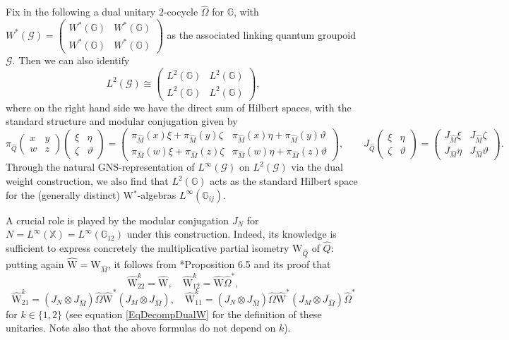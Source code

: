 \documentclass[reqno]{amsart}
\numberwithin{equation}{section}
\newcommand{\G}{\mathbb{G}}
\newcommand{\X}{\mathbb{X}}
\newcommand{\msG}{\mathscr{G}}
\newcommand{\ww}{\mathrm{W}}
\begin{document}
Fix in the following a dual unitary $2$-cocycle $\hat{\Omega}$ for $\G$, with $W^*(\msG) = \begin{pmatrix} W^*(\G) & W^*(\G)\\ W^*(\G)& W^*(\G)\end{pmatrix}$ as the associated linking quantum groupoid $\msG$. Then we can also identify
\[
L^2(\msG)\cong \begin{pmatrix} L^2(\G)& L^2(\G)\\L^2(\G)&L^2(\G)\end{pmatrix}, 
\] 
where on the right hand side we have the direct sum of Hilbert spaces, with the standard structure and modular conjugation given by 
\[
\pi_{\hat{Q}}\begin{pmatrix} x & y \\ w & z\end{pmatrix}
\begin{pmatrix}
\xi & \eta \\ \zeta & \vartheta
\end{pmatrix}
 = \begin{pmatrix} \pi_{\hat{M}}(x)\xi + \pi_{\hat{M}}(y) \zeta & \pi_{\hat{M}}(x)\eta +\pi_{\hat{M}}(y)\vartheta\\ \pi_{\hat{M}}(w)\xi+\pi_{\hat{M}}(z)\zeta & \pi_{\hat{M}}(w)\eta +\pi_{\hat{M}}(z)\vartheta\end{pmatrix},\qquad J_{\hat{Q}}\begin{pmatrix} \xi & \eta\\ \zeta & \vartheta\end{pmatrix} = \begin{pmatrix} J_{\hat{M}}\xi & J_{\hat{M}}\zeta\\ J_{\hat{M}}\eta & J_{\hat{M}}\vartheta\end{pmatrix}. 
\]
Through the natural GNS-representation of $L^{\infty}(\msG)$ on $L^2(\msG)$ via the dual weight construction, we also find that $L^2(\G)$ acts as the standard Hilbert space for the (generally distinct) W$^*$-algebras $L^{\infty}(\G_{ij})$. 

A crucial role is played by the modular conjugation $J_N$ for $N = L^{\infty}(\X) = L^{\infty}(\G_{12})$ under this construction. Indeed, its knowledge is sufficient to express concretely the multiplicative partial isometry $\ww_{\hat{Q}}$ of $\hat{Q}$: putting again $\hat{\ww}= \ww_{\hat{M}}$, it follows from \cite{DC11b}*{Proposition 6.5} and its proof that
\begin{equation}\label{EqMultUnitCocy1}
\hat{\ww}^k_{22} = \hat{\ww},\quad \hat{\ww}^k_{12} = \hat{\ww}\hat{\Omega}^*,
\end{equation}
\begin{equation}\label{EqMultUnitCocy2}
\hat{\ww}^k_{21} = (J_N\otimes J_{\hat{M}})\hat{\Omega} \hat{\ww}^*(J_M\otimes J_{\hat{M}}),\quad \hat{\ww}^k_{11} = (J_N\otimes J_{\hat{M}})\hat{\Omega} \hat{\ww}^*(J_M\otimes J_{\hat{M}})\hat{\Omega}^*
\end{equation}
for $k\in \{1,2\}$ (see equation \eqref{EqDecompDualW} for the definition of these unitaries. Note also that the above formulas do not depend on $k$).
\end{document}
